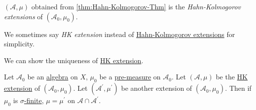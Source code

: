 \begin{definition}\label{def:HK-extension}
	\((\mathcal{A} , \mu )\) obtained from \autoref{thm:Hahn-Kolmogorov-Thm} is the \emph{Hahn-Kolmogorov extensions} of \((\mathcal{A} _0, \mu _0)\).
\end{definition}
\begin{note}
	We sometimes say \emph{HK extension} instead of \hyperref[def:HK-extension]{Hahn-Kolmogorov extensions} for simplicity.
\end{note}

We can show the uniqueness of \hyperref[def:HK-extension]{HK extension}.

\begin{theorem}\label{thm:uniqueness-of-HK-extension}
	Let \(\mathcal{A}_0\) be an \hyperref[def:algebra]{algebra} on \(X\), \(\mu _0\) be a \hyperref[def:pre-measure]{pre-measure} on \(\mathcal{A} _0\). Let \((\mathcal{A} , \mu)\)
	be the \hyperref[def:HK-extension]{HK extension} of \((\mathcal{A} _0, \mu _0)\). Let \((\mathcal{A} ^\prime , \mu ^\prime )\) be another extension of \((\mathcal{A} _0, \mu _0)\).
	Then if \(\mu _0\) is \hyperref[def:sigma-finite-measure]{\(\sigma\)-finite}, \(\mu  = \mu ^\prime \) on \(\mathcal{A} \cap \mathcal{A} ^\prime \).
\end{theorem}
